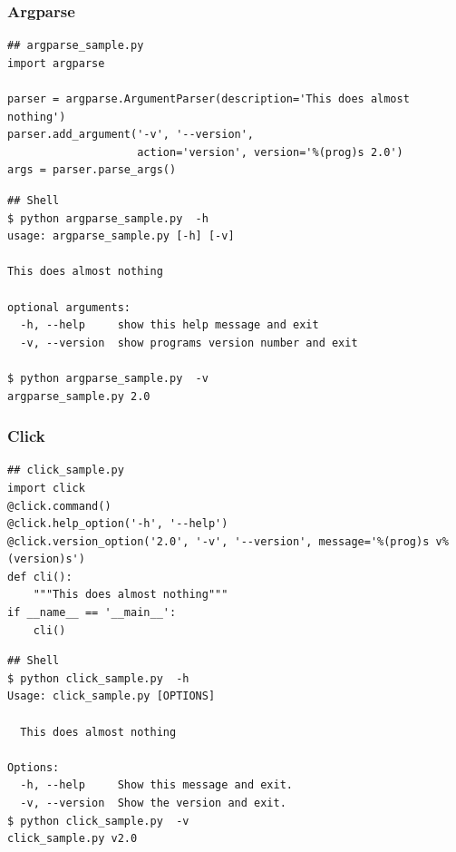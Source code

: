 \documentclass[handout]{beamer}
\begin{document}
\begin{frame}[fragile]
\frametitle{Argparse}

{\scriptsize
\begin{verbatim}
## argparse_sample.py
import argparse
 
parser = argparse.ArgumentParser(description='This does almost nothing')
parser.add_argument('-v', '--version', 
                    action='version', version='%(prog)s 2.0')
args = parser.parse_args()
\end{verbatim}

\hfill

\begin{verbatim}
## Shell
$ python argparse_sample.py  -h
usage: argparse_sample.py [-h] [-v]
 
This does almost nothing
 
optional arguments:
  -h, --help     show this help message and exit
  -v, --version  show programs version number and exit
 
$ python argparse_sample.py  -v
argparse_sample.py 2.0
\end{verbatim}
}

\end{frame}


\begin{frame}[fragile]
\frametitle{Click}

{\scriptsize
\begin{verbatim}
## click_sample.py
import click
@click.command()
@click.help_option('-h', '--help')
@click.version_option('2.0', '-v', '--version', message='%(prog)s v%(version)s')
def cli():
    """This does almost nothing"""
if __name__ == '__main__':
    cli()
\end{verbatim}

\hfill

\begin{verbatim}
## Shell
$ python click_sample.py  -h
Usage: click_sample.py [OPTIONS]

  This does almost nothing

Options:
  -h, --help     Show this message and exit.
  -v, --version  Show the version and exit.
$ python click_sample.py  -v
click_sample.py v2.0
\end{verbatim}
}

\end{frame}
\end{document}

